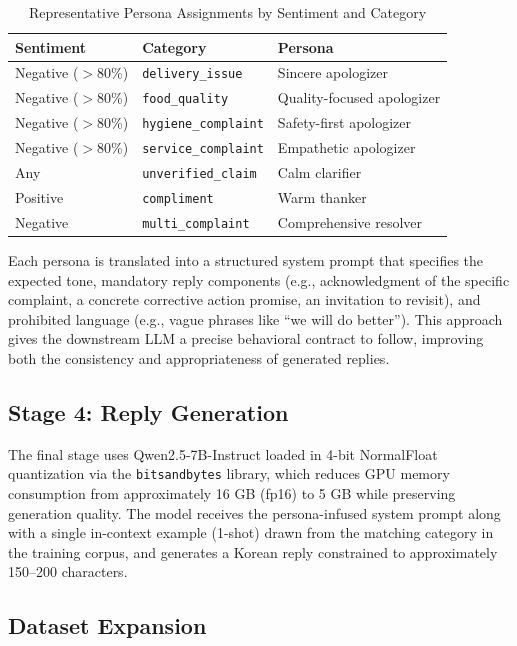 \documentclass[conference]{IEEEtran}
\begin{document}
\begin{table}[t]
\centering
\caption{Representative Persona Assignments by Sentiment and Category}
\label{tab:personas}
\begin{tabular}{lll}
\toprule
\textbf{Sentiment} & \textbf{Category} & \textbf{Persona} \\
\midrule
Negative ($>$80\%) & \texttt{delivery\_issue}      & Sincere apologizer \\
Negative ($>$80\%) & \texttt{food\_quality}        & Quality-focused apologizer \\
Negative ($>$80\%) & \texttt{hygiene\_complaint}   & Safety-first apologizer \\
Negative ($>$80\%) & \texttt{service\_complaint}   & Empathetic apologizer \\
Any                & \texttt{unverified\_claim}    & Calm clarifier \\
Positive           & \texttt{compliment}           & Warm thanker \\
Negative           & \texttt{multi\_complaint}     & Comprehensive resolver \\
\bottomrule
\end{tabular}
\end{table}

Each persona is translated into a structured system prompt that
specifies the expected tone, mandatory reply components (e.g.,
acknowledgment of the specific complaint, a concrete corrective
action promise, an invitation to revisit), and prohibited language
(e.g., vague phrases like ``we will do better'').
This approach gives the downstream LLM a precise behavioral contract
to follow, improving both the consistency and appropriateness of
generated replies.

\subsection{Stage 4: Reply Generation}

The final stage uses Qwen2.5-7B-Instruct loaded in 4-bit NormalFloat
quantization via the \texttt{bitsandbytes} library, which reduces GPU
memory consumption from approximately 16 GB (fp16) to 5 GB while
preserving generation quality.
The model receives the persona-infused system prompt along with
a single in-context example (1-shot) drawn from the matching
category in the training corpus, and generates a Korean reply
constrained to approximately 150--200 characters.

\subsection{Dataset Expansion}
\end{document}
